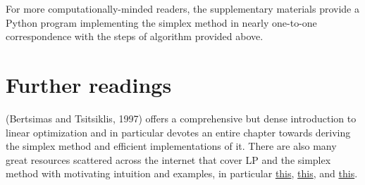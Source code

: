 \documentclass{paper}
\begin{document}
\medskip
For more computationally-minded readers, the supplementary materials provide a Python program implementing the simplex method in nearly one-to-one correspondence with the steps of algorithm provided above. 

\section{Further readings}
(Bertsimas and Tsitsiklis, 1997) offers a comprehensive but dense introduction to linear optimization and in particular devotes an entire chapter towards deriving the simplex method and efficient implementations of it. There are also many great resources scattered across the internet that cover LP and the simplex method with motivating intuition and examples, in particular  \href{https://mitocw.ups.edu.ec/courses/electrical-engineering-and-computer-science/6-046j-design-and-analysis-of-algorithms-spring-2015/lecture-notes/MIT6_046JS15_lec15.pdf}{this}, \href{https://www2.isye.gatech.edu/~sahmed/isye3133b/simplex}{this}, and \href{https://ocw.mit.edu/courses/electrical-engineering-and-computer-science/6-251j-introduction-to-mathematical-programming-fall-2009/lecture-notes/MIT6_251JF09_lec05.pdf}{this}. 
\end{document}
